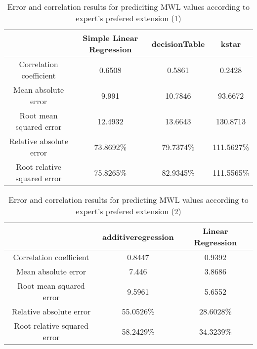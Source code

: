 \begin{table}[!htbp]
\centering
\begin{tabular}{|c|c|c|c|}
\hline
                            & Simple Linear Regression   & decisionTable  & kstar\\ \hline
Correlation coefficient     & 0.6508        & 0.5861         & 0.2428       \\
Mean absolute error         & 9.991        & 10.7846        & 93.6672       \\
Root mean squared error     & 12.4932      & 13.6643       & 130.8713       \\
Relative absolute error     & 73.8692\%    & 79.7374\%        & 111.5627\%  \\
Root relative squared error & 75.8265\%     & 82.9345\%      & 111.5565\%   \\
\hline
\end{tabular}
\caption{Error and correlation results for prediciting MWL values according to expert's prefered extension (1)}
\label{tab:mlhybrid1}
\end{table}


\begin{table}[!htbp]
\centering
\begin{tabular}{|c|c|c|}
\hline
                            & additiveregression & Linear Regression\\ \hline
Correlation coefficient     & 0.8447    & 0.9392 \\
Mean absolute error         & 7.446      & 3.8686 \\
Root mean squared error     & 9.5961    & 5.6552  \\
Relative absolute error     & 55.0526\% & 28.6028\%\\
Root relative squared error & 58.2429\%  & 34.3239\%\\
\hline
\end{tabular}
\caption{Error and correlation results for predicting MWL values according to expert's prefered extension (2)}
\label{tab:mlhybrid2}
\end{table}